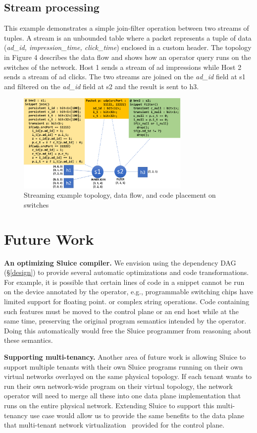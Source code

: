 \subsection{Stream processing}

This example demonstrates a simple join-filter operation between two streams of
tuples. A stream is an unbounded table where a packet represents a tuple of
data (\textit{ad\_id, impression\_time, click\_time}) enclosed in a custom
header. The topology in Figure 4 describes the data flow and shows how an
operator query runs on the switches of the network. Host 1 sends a stream of ad
impressions while Host 2 sends a stream of ad clicks. The two streams are
joined on the \textit{ad\_id} field at s1 and filtered on the \textit{ad\_id}
field at s2 and the result is sent to h3. 

\begin{figure}[tp]
\centering
\includegraphics[width=84mm]{figures/streaming_example}
\caption{Streaming example topology, data flow, and code placement on switches}
\vspace{-5mm}
\end{figure}
\vspace{-3mm}


\section{Future Work}
\textbf{An optimizing Sluice compiler.} We envision using the dependency DAG (\S\ref{design}) to
provide several automatic optimizations and code transformations. For example,
it is possible that certain lines of code in a snippet cannot be run on the
device annotated by the operator, e.g., programmable switching chips have
limited support for floating point. or complex string operations. Code
containing such features must be moved to the control plane or an end host while at the same time, preserving the original program semantics intended by the operator. Doing this automatically would free the Sluice programmer from reasoning about these semantics.

\textbf{Supporting multi-tenancy.} Another area of future work is allowing
Sluice to support multiple tenants with their own Sluice
programs running on their own virtual networks overlayed on the same physical
topology. If each tenant wants to run their own network-wide program on their
virtual topology, the network operator will need to merge all these into one
data plane implementation that runs on the entire physical network. Extending
Sluice to support this multi-tenancy use case would allow us to provide the
same benefits to the data plane that multi-tenant network
virtualization~\cite{multitenant} provided for the control plane.
